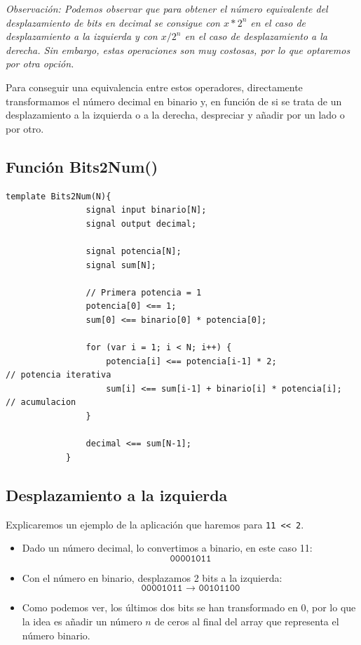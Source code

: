 \documentclass[a4paper,10pt]{article}
\begin{document}
		\vspace{0.1cm}
		
		\noindent \textit{Observación: Podemos observar que para obtener el número equivalente del desplazamiento de bits en decimal se consigue con $x * 2^n$ en el caso de desplazamiento a la izquierda y con $x / 2^n$ en el caso de desplazamiento a la derecha. Sin embargo, estas operaciones son muy costosas, por lo que optaremos por otra opción.}
		
		\vspace{0.3cm}
		
		\noindent Para conseguir una equivalencia entre estos operadores, directamente transformamos el número decimal en binario y, en función de si se trata de un desplazamiento a la izquierda o a la derecha, despreciar y añadir por un lado o por otro.
		
		\vspace{0.4cm}
		
		\subsection*{Función Bits2Num()}
		\begin{lstlisting}[language=Circom]
			template Bits2Num(N){
				signal input binario[N];
				signal output decimal;
				
				signal potencia[N];
				signal sum[N];
				
				// Primera potencia = 1
				potencia[0] <== 1;
				sum[0] <== binario[0] * potencia[0];
				
				for (var i = 1; i < N; i++) {
					potencia[i] <== potencia[i-1] * 2;                 // potencia iterativa
					sum[i] <== sum[i-1] + binario[i] * potencia[i];    // acumulacion
				}
				
				decimal <== sum[N-1];
			}
		\end{lstlisting}
		
		
		\subsection*{Desplazamiento a la izquierda}
		\noindent Explicaremos un ejemplo de la aplicación que haremos para \verb|11 << 2|.
		
		\begin{itemize}
			\item Dado un número decimal, lo convertimos a binario, en este caso 11:
			\begin{equation*}
				\texttt{00001011}
			\end{equation*}
			
			\item Con el número en binario, desplazamos 2 bits a la izquierda:
			\begin{equation*}
				\texttt{00001011 → 00101100}
			\end{equation*}
			
			\item Como podemos ver, los últimos dos bits se han transformado en 0, por lo que la idea es añadir un número $n$ de ceros al final del array que representa el número binario.
		\end{itemize}
		
\end{document}
